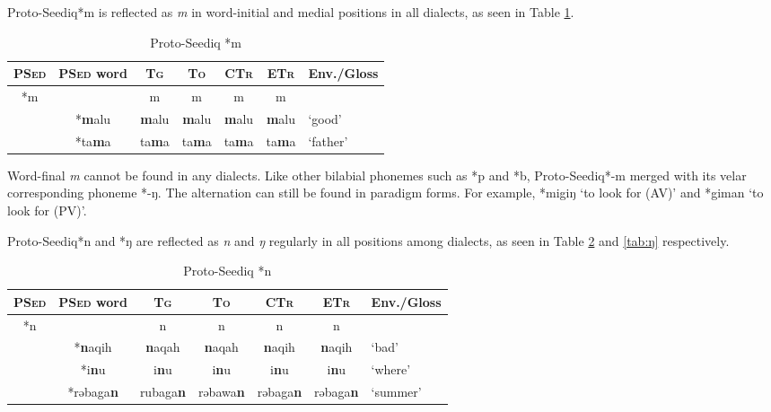 \documentclass[12pt]{article}
\newcommand{\psed}{\textsc{PSed}\xspace}
\newcommand{\psedf}{Proto-Seediq\xspace}
\newcommand{\stg}{\textsc{Tg}\xspace}
\newcommand{\sto}{\textsc{To}\xspace}
\newcommand{\sctr}{\textsc{CTr}\xspace}
\newcommand{\setr}{\textsc{ETr}\xspace}
\begin{document}
\psedf *m is reflected as \textit{m} in word-initial and medial positions in all dialects, as seen in Table \ref{tab:m}.

\begin{table}[!htbp]
\centering
\caption{Proto-Seediq *m}
\label{tab:m}
\begin{tabular}{c|c|cccc|l}
\textbf{\psed} & \textbf{\psed word}      & \textbf{\stg} & \textbf{\sto} & \textbf{\sctr} & \textbf{\setr} & \multicolumn{1}{c}{\textbf{Env./Gloss}} \\ \hline
\multirow{3}{*}{*m} & & m   & m   & m   & m   \\ \cline{2-7}
                    & *\textbf{m}alu & \textbf{m}alu & \textbf{m}alu & \textbf{m}alu & \textbf{m}alu & `good' \\
                    & *ta\textbf{m}a & ta\textbf{m}a & ta\textbf{m}a & ta\textbf{m}a & ta\textbf{m}a  & `father' \\ \hline
\end{tabular}
\end{table}

Word-final \textit{m} cannot be found in any dialects. Like other bilabial phonemes such as *p and *b, \psedf *-m merged with its velar corresponding phoneme *-ŋ. The alternation can still be found in paradigm forms. For example, *migiŋ `to look for (AV)' and *giman `to look for (PV)'. 

\psedf *n and *ŋ are reflected as \textit{n} and \textit{ŋ} regularly in all positions among dialects, as seen in Table \ref{tab:n} and \ref{tab:ŋ} respectively. 

\begin{table}[!htbp]
\centering
\caption{Proto-Seediq *n}
\label{tab:n}
\begin{tabular}{c|c|cccc|l}
\textbf{\psed} & \textbf{\psed word}      & \textbf{\stg} & \textbf{\sto} & \textbf{\sctr} & \textbf{\setr} & \multicolumn{1}{c}{\textbf{Env./Gloss}} \\ \hline
\multirow{4}{*}{*n} & & n   & n   & n   & n \\ \cline{2-7}
                    & *\textbf{n}aqih & \textbf{n}aqah & \textbf{n}aqah & \textbf{n}aqih & \textbf{n}aqih & `bad' \\ 
                    & *i\textbf{n}u & i\textbf{n}u & i\textbf{n}u & i\textbf{n}u & i\textbf{n}u & `where' \\
                    & *rəbaga\textbf{n} & rubaga\textbf{n} & rəbawa\textbf{n} & rəbaga\textbf{n} & rəbaga\textbf{n} & `summer' \\ \hline
\end{tabular}
\end{table}
\end{document}
